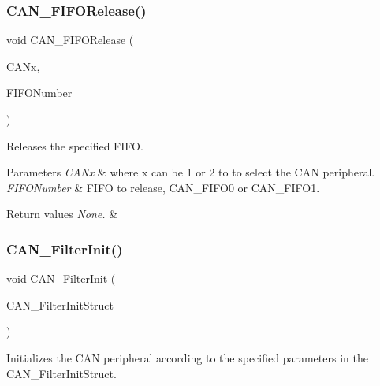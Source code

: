 \subsubsection{\texorpdfstring{CAN\_FIFORelease()}{CAN\_FIFORelease()}}
{\footnotesize\ttfamily void C\+A\+N\+\_\+\+F\+I\+F\+O\+Release (\begin{DoxyParamCaption}\item[{\mbox{\hyperlink{struct_c_a_n___type_def}{C\+A\+N\+\_\+\+Type\+Def}} $\ast$}]{C\+A\+Nx,  }\item[{uint8\+\_\+t}]{F\+I\+F\+O\+Number }\end{DoxyParamCaption})}



Releases the specified F\+I\+FO. 


\begin{DoxyParams}{Parameters}
{\em C\+A\+Nx} & where x can be 1 or 2 to to select the C\+AN peripheral. \\
\hline
{\em F\+I\+F\+O\+Number} & F\+I\+FO to release, C\+A\+N\+\_\+\+F\+I\+F\+O0 or C\+A\+N\+\_\+\+F\+I\+F\+O1. \\
\hline
\end{DoxyParams}

\begin{DoxyRetVals}{Return values}
{\em None.} & \\
\hline
\end{DoxyRetVals}
\mbox{\label{group___c_a_n___exported___functions_ga39476830280340363c51041be6b12647}} 
\subsubsection{\texorpdfstring{CAN\_FilterInit()}{CAN\_FilterInit()}}
{\footnotesize\ttfamily void C\+A\+N\+\_\+\+Filter\+Init (\begin{DoxyParamCaption}\item[{\mbox{\hyperlink{struct_c_a_n___filter_init_type_def}{C\+A\+N\+\_\+\+Filter\+Init\+Type\+Def}} $\ast$}]{C\+A\+N\+\_\+\+Filter\+Init\+Struct }\end{DoxyParamCaption})}



Initializes the C\+AN peripheral according to the specified parameters in the C\+A\+N\+\_\+\+Filter\+Init\+Struct. 


